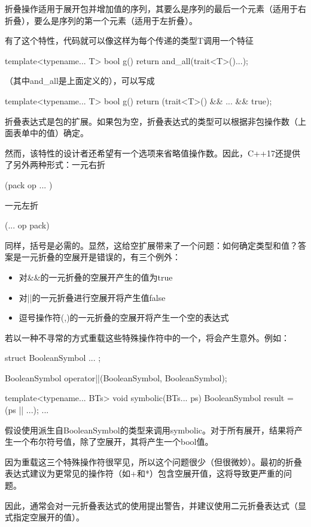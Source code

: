 折叠操作适用于展开包并增加值的序列，其要么是序列的最后一个元素（适用于右折叠），要么是序列的第一个元素（适用于左折叠）。

有了这个特性，代码就可以像这样为每个传递的类型T调用一个特征

\begin{cpp}
template<typename... T> bool g() {
	return and_all(trait<T>()...);
}
\end{cpp}

（其中and\_all是上面定义的），可以写成

\begin{cpp}
template<typename... T> bool g() {
	return (trait<T>() && ... && true);
}
\end{cpp}

折叠表达式是包的扩展。如果包为空，折叠表达式的类型可以根据非包操作数（上面表单中的值）确定。

然而，该特性的设计者还希望有一个选项来省略值操作数。因此，C++17还提供了另外两种形式：一元右折

\begin{cpp}
(pack op ... )
\end{cpp}

一元左折

\begin{cpp}
(... op pack)
\end{cpp}

同样，括号是必需的。显然，这给空扩展带来了一个问题：如何确定类型和值？答案是一元折叠的空展开是错误的，有三个例外：

\begin{itemize}
\item
对\&\&的一元折叠的空展开产生的值为true

\item
对||的一元折叠进行空展开将产生值false

\item
逗号操作符(,)的一元折叠的空展开将产生一个空的表达式
\end{itemize}

若以一种不寻常的方式重载这些特殊操作符中的一个，将会产生意外。例如：

\begin{cpp}
struct BooleanSymbol {
	...
};

BooleanSymbol operator||(BooleanSymbol, BooleanSymbol);

template<typename... BTs> void symbolic(BTs... ps) {
	BooleanSymbol result = (ps || ...);
	...
}
\end{cpp}

假设使用派生自BooleanSymbol的类型来调用symbolic。对于所有展开，结果将产生一个布尔符号值，除了空展开，其将产生一个bool值。

\begin{notice}
因为重载这三个特殊操作符很罕见，所以这个问题很少（但很微妙）。最初的折叠表达式建议为更常见的操作符（如+和*）包含空展开值，这将导致更严重的问题。
\end{notice}

因此，通常会对一元折叠表达式的使用提出警告，并建议使用二元折叠表达式（显式指定空展开的值）。






